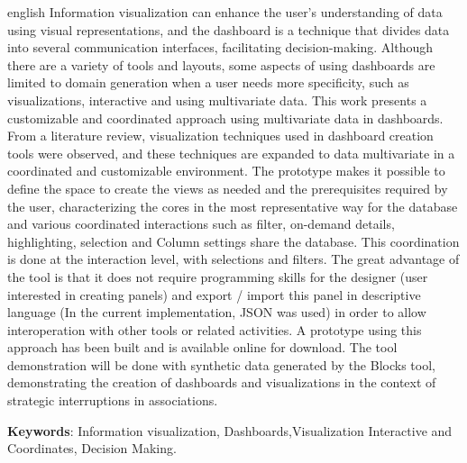 \documentclass[
	12pt,				%
	openright,			%
	oneside,			%
	a4paper,			%
	english,			%
	brazil				%
	]{abntex2}
\begin{document}
\begin{resumo}[Abstract]
 \begin{otherlanguage*}{english}
   Information visualization can enhance the user's understanding of data using visual representations, and the dashboard is a technique that divides data into several communication interfaces, facilitating decision-making. Although there are a variety of tools and layouts, some aspects of using dashboards are limited to domain generation when a user needs more specificity, such as visualizations, interactive and using multivariate data. This work presents a customizable and coordinated approach using multivariate data in dashboards. From a literature review, visualization techniques used in dashboard creation tools were observed, and these techniques are expanded to data multivariate in a coordinated and customizable environment. The prototype makes it possible to define the space to create the views as needed and the prerequisites required by the user, characterizing the cores in the most representative way for the database and various coordinated interactions such as filter, on-demand details, highlighting, selection and Column settings share the database. This coordination is done at the interaction level, with selections and filters. The great advantage of the tool is that it does not require programming skills for the designer (user interested in creating panels) and export / import this panel in descriptive language (In the current implementation, JSON was used) in order to allow interoperation with other tools or related activities. A prototype using this approach has been built and is available online for download. The tool demonstration will be done with synthetic data generated by the Blocks tool, demonstrating the creation of dashboards and visualizations in the context of strategic interruptions in associations.

   \vspace{\onelineskip}
 
   \noindent 
   \textbf{Keywords}: Information visualization, Dashboards,Visualization Interactive and Coordinates, Decision Making.

 \end{otherlanguage*}
\end{resumo}


\listoffigures*
\cleardoublepage

\end{document}
